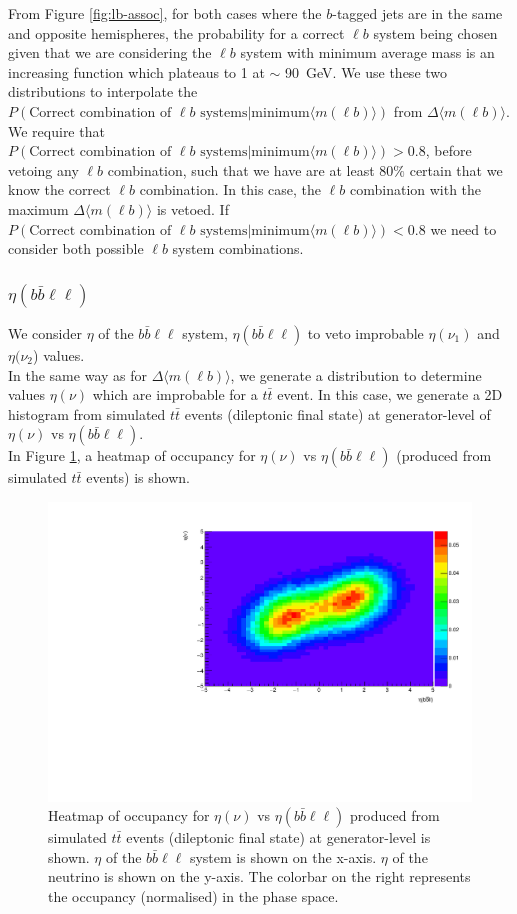 From Figure \ref{fig:lb-assoc}, for both cases where the $b$-tagged jets are in the same and opposite hemispheres, the probability for a correct $\ell b$ system being chosen given that we are considering the $\ell b$ system with minimum average mass is an increasing function which plateaus to 1 at $\sim$ \SI{90}{\GeV}. We use these two distributions to interpolate the $P(\text{Correct combination of } \ell b \text{ systems} | \text{minimum} \langle m(\ell b) \rangle)$ from $\Delta \langle m(\ell b) \rangle$. We require that $P(\text{Correct combination of } \ell b \text{ systems} | \text{minimum} \langle m(\ell b) \rangle) > 0.8$, before vetoing any $\ell b$ combination, such that we have are at least 80$\%$ certain that we know the correct $\ell b$ combination. In this case, the $\ell b$ combination with the maximum $\Delta \langle m(\ell b) \rangle$ is vetoed. If $P(\text{Correct combination of } \ell b \text{ systems} | \text{minimum} \langle m(\ell b) \rangle) < 0.8$ we need to consider both possible $\ell b$ system combinations. 

\subsubsection{$\eta(b\bar{b}\ell\ell)$}
\label{sec:eta-llbb-subsection}

We consider $\eta$ of the $b\bar{b}\ell\ell$ system, $\eta(b\bar{b}\ell\ell)$ to veto improbable $\eta(\nu_{1})$ and $\eta(\nu_{2}$) values.\\

In the same way as for $\Delta \langle m(\ell b)\rangle$, we generate a distribution to determine values $\eta(\nu)$ which are improbable for a $t\bar{t}$ event. In this case, we generate a 2D histogram from simulated $t\bar{t}$ events (dileptonic final state) at generator-level of $\eta (\nu)$ vs $\eta(b\bar{b}\ell\ell)$.\\

In Figure \ref{fig:eta-bbll-heatmap}, a heatmap of occupancy for $\eta (\nu)$ vs $\eta(b\bar{b}\ell\ell)$ (produced from simulated $t\bar{t}$ events) is shown. 

 \begin{figure}[h!]
	\includegraphics[width=0.6\linewidth]{figures/bbll_occ_2vSM.pdf}
	\centering
	\caption{Heatmap of occupancy for $\eta (\nu)$ vs $\eta(b\bar{b}\ell\ell)$ produced from simulated $t\bar{t}$ events (dileptonic final state) at generator-level is shown. $\eta$ of the $b\bar{b}\ell\ell$ system is shown on the x-axis. $\eta$ of the neutrino is shown on the y-axis. The colorbar on the right represents the occupancy (normalised) in the phase space.}
	\label{fig:eta-bbll-heatmap}
\end{figure}

